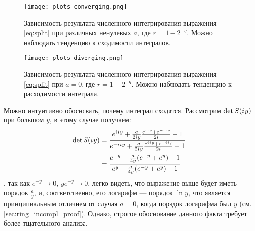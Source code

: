 \begin{figure}[ht]
  \centering
  \texttt{[image: plots\_converging.png]}
  \caption
   {
   Зависимость результата численного интегрирования выражения \ref{eq:split} при различных ненулевых $a$, где $r = 1 - 2^{-q}$. Можно наблюдать тенденцию к сходимости интегралов.
   }\label{fig:ring_convergence}
\end{figure}

\begin{figure}[ht]
  \centering
  \texttt{[image: plots\_diverging.png]}
  \caption
   {
   Зависимость результата численного интегрирования выражения \ref{eq:split} при $a = 0$, где $r = 1 - 2^{-q}$. Можно наблюдать тенденцию к расходимости интеграла.
   }\label{fig:ring_divergence}
\end{figure}

Можно интуитивно обосновать, почему интеграл сходится. Рассмотрим $\det S({i\mkern1mu} y)$ при большом $y$, в этому случае получаем:
\begin{align*}
\det S({i\mkern1mu} y)
&= 
\frac
{e^{{i\mkern1mu} {i\mkern1mu} y} + \frac{a}{2 {i\mkern1mu} y} \frac{e^{{i\mkern1mu} {i\mkern1mu} y} + e^{-{i\mkern1mu} {i\mkern1mu} y}}{2{i\mkern1mu}} - 1}
{e^{-{i\mkern1mu} {i\mkern1mu} y} + \frac{a}{2 {i\mkern1mu} y} \frac{e^{{i\mkern1mu} {i\mkern1mu} y} + e^{-{i\mkern1mu} {i\mkern1mu} y}}{2{i\mkern1mu}} - 1}
\\ &=
\frac
{e^{- y} - \frac{a}{4 y} (e^{- y} + e^{y}) - 1}
{e^{y} - \frac{a}{4 y}  (e^{- y} + e^{y}) - 1}
\end{align*}
, так как $e^{-y} \to 0$, $y e^{-y} \to 0$, легко видеть, что выражение выше будет иметь порядок $\frac{a}{y}$, и, соответственно, его логарифм — порядок $\ln y$, что является принципиальным отличием от случая $a=0$, когда порядок логарифма был $y$ (см. \autoref{sec:ring_incompl_proof}). Однако, строгое обоснование данного факта требует более тщательного анализа.
